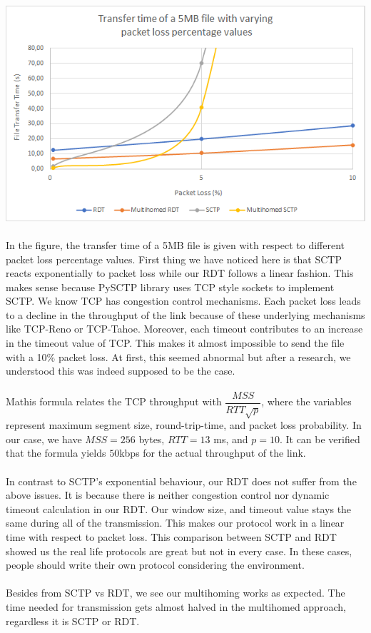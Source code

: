 \documentclass[12pt]{article}
\begin{document}
\includegraphics[scale=0.8]{graph1.png}
\\\\
In the figure, the transfer time of a 5MB file is given with respect to different packet loss percentage values. First thing we have noticed here is that SCTP reacts exponentially to packet loss while our RDT follows a linear fashion. This makes sense because PySCTP library uses TCP style sockets to implement SCTP. We know TCP has congestion control mechanisms. Each packet loss leads to a decline in the throughput of the link because of these underlying mechanisms like TCP-Reno or TCP-Tahoe. Moreover, each timeout contributes to an increase in the timeout value of TCP. This makes it almost impossible to send the file with a 10\% packet loss. At first, this seemed abnormal but after a research, we understood this was indeed supposed to be the case.\\
\\Mathis formula relates the TCP throughput with $\dfrac{MSS}{RTT\sqrt{p}}$, where the variables represent maximum segment size, round-trip-time, and packet loss probability. In our case, we have $MSS = 256$ bytes, $RTT = 13$ ms, and $p = 10$. It can be verified that the formula yields $50$kbps for the actual throughput of the link.
\\\\In contrast to SCTP's exponential behaviour, our RDT does not suffer from the above issues. It is because there is neither congestion control nor dynamic timeout calculation in our RDT. Our window size, and timeout value stays the same during all of the transmission.  This makes our protocol work in a linear time with respect to packet loss. This comparison between SCTP and RDT showed us the real life protocols are great but not in every case. In these cases, people should write their own protocol considering the environment.\\\\
Besides from SCTP vs RDT, we see our multihoming works as expected. The time needed for transmission gets almost halved in the multihomed approach, regardless it is SCTP or RDT.
\end{document}
